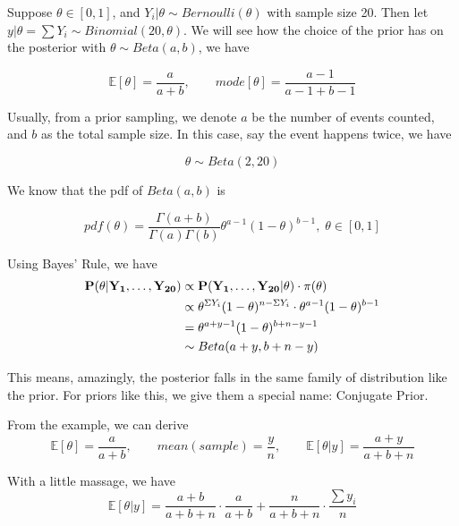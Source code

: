 \begin{example}
    Suppose $\theta \in [0,1]$, and $Y_i|\theta \sim Bernoulli(\theta)$ with sample size 20. Then let $y|\theta = \sum Y_i \sim Binomial(20, \theta)$. We will see how the choice of the prior has on the posterior with $\theta \sim Beta(a,b)$, we have
    
    \begin{equation*}
        \mathbb{E}[\theta] = \frac{a}{a+b}, \qquad mode[\theta] = \frac{a-1}{a-1+b-1}
    \end{equation*}

    Usually, from a prior sampling, we denote $a$ be the number of events counted, and $b$ as the total sample size. In this case, say the event happens twice, we have

    \begin{equation*}
        \theta \sim Beta(2, 20)
    \end{equation*}

    We know that the pdf of $Beta(a,b)$ is 

    \begin{equation*}
        pdf(\theta) = \frac{\Gamma(a + b)}{\Gamma(a)\Gamma(b)}\theta^{a-1}(1-\theta)^{b-1}, \; \theta \in [0,1]
    \end{equation*}

    Using Bayes' Rule, we have 
    \begin{align*}
        \bf{P}(\theta|Y_1, \ldots, Y_{20}) &\propto \bf{P}(Y_1, \ldots, Y_{20}|\theta) \cdot \pi(\theta) \\
        &\propto \theta^{\Sigma Y_i}(1-\theta)^{n - \Sigma Y_i} \cdot \theta^{a-1}(1-\theta)^{b-1} \\
        &=\theta^{a + y - 1} (1-\theta)^{b + n - y - 1}\\
        &\sim Beta(a + y, b + n - y)
    \end{align*}

    This means, amazingly, the posterior falls in the same family of distribution like the prior. For priors like this, we give them a special name: Conjugate Prior. 
\end{example}

From the example, we can derive
\begin{equation*}
    \mathbb{E}[\theta] = \frac{a}{a+b}, \qquad mean(sample) = \frac{y}{n}, \qquad \mathbb{E}[\theta | y] = \frac{a + y}{a+ b + n}
\end{equation*}

With a little massage, we have
\begin{equation*}
    \mathbb{E}[\theta|y] = \frac{a+b}{a+b+n} \cdot \frac{a}{a+b} + \frac{n}{a+b+n} \cdot \frac{\sum y_i}{n}
\end{equation*}

